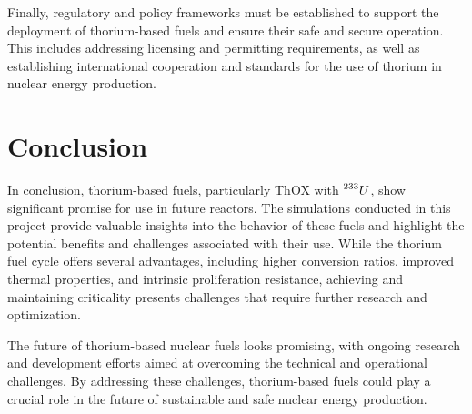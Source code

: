Finally, regulatory and policy frameworks must be established to support the deployment of thorium-based fuels and ensure their safe and secure operation. This includes addressing licensing and permitting requirements, as well as establishing international cooperation and standards for the use of thorium in nuclear energy production.

\section{Conclusion}

In conclusion, thorium-based fuels, particularly ThOX with \(\prescript{233}{}{U}\), show significant promise for use in future reactors. The simulations conducted in this project provide valuable insights into the behavior of these fuels and highlight the potential benefits and challenges associated with their use. While the thorium fuel cycle offers several advantages, including higher conversion ratios, improved thermal properties, and intrinsic proliferation resistance, achieving and maintaining criticality presents challenges that require further research and optimization.

The future of thorium-based nuclear fuels looks promising, with ongoing research and development efforts aimed at overcoming the technical and operational challenges. By addressing these challenges, thorium-based fuels could play a crucial role in the future of sustainable and safe nuclear energy production.